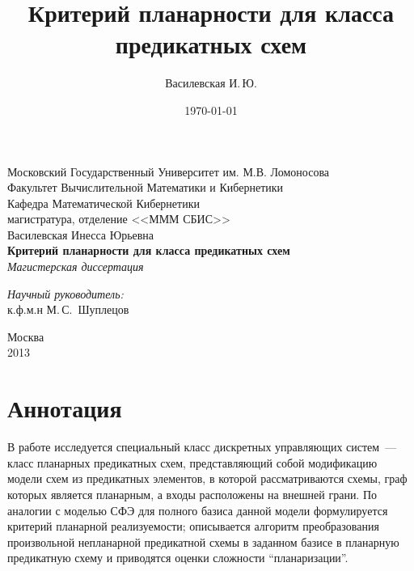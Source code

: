 \documentclass[12pt]{extarticle}
\title{Критерий планарности для класса предикатных схем}
\author{Василевская И.\,Ю.}
\date{\today}
\begin{document}
    \begin{titlepage}
        \begin{center}
            Московский Государственный Университет им. М.В. Ломоносова\\
            Факультет Вычислительной Математики и Кибернетики\\
            Кафедра Математической Кибернетики\\
            магистратура, отделение <<МММ СБИС>>\\[6cm]

            \large {Василевская Инесса Юрьевна}\\
            \LARGE \textbf {Критерий планарности для класса предикатных схем}\\[0.8cm]
            \large \emph {Магистерская диссертация}\\[5.0cm]

            \begin{flushright}
                \large
                \begin{minipage}{0.40\textwidth}
                    \begin{flushleft}
                        \emph{Научный руководитель:}\\к.ф.м.н М.\,С.~Шуплецов
                    \end{flushleft}
                \end{minipage}
            \end{flushright}

            \vfill
            Москва\\
			2013
        \end{center}
    \end{titlepage}

\setcounter{page}{2}

\section*{Аннотация}
\label{anno}
В работе исследуется специальный класс дискретных управляющих систем~--- класс планарных предикатных схем, 
представляющий собой модификацию модели схем из предикатных элементов, в которой рассматриваются схемы,
граф которых является планарным, а входы расположены на внешней грани.
По аналогии с моделью СФЭ для полного базиса данной модели формулируется критерий планарной
реализуемости; описывается алгоритм преобразования произвольной непланарной предикатной схемы 
в заданном базисе в планарную предикатную схему и приводятся оценки сложности ``планаризации''.
\tableofcontents
\clearpage
\end{document}
